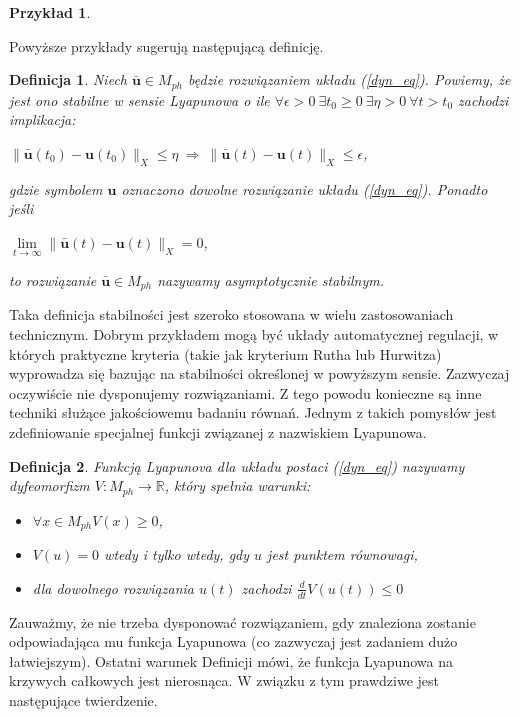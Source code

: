\documentclass[12pt]{article}
\newtheorem{defi}{Definicja}
\newtheorem{przyklad}{Przykład}
\begin{document}
\begin{przyklad}
\end{przyklad}
Powyższe przykłady sugerują następującą definicję.
\begin{defi}\label{stable_point}
	Niech $ \bar{\textbf{u}} \in M_{ph} $ będzie rozwiązaniem układu (\ref{dyn_eq}). Powiemy, że jest ono stabilne w sensie Lyapunowa o ile $\forall \epsilon>0 \  \exists t_{0} \geq 0 \  \exists \eta>0 \  \forall t>t_{0}$ zachodzi implikacja:\newline
\centerline {$ 	\|\bar{\textbf{u}}(t_{0}) - \textbf{u}(t_{0}) \|_{X}  \leq \eta \  \Rightarrow \ \|\bar{\textbf{u}}(t) - \textbf{u}(t) \|_{X}  \leq \epsilon$,}
gdzie symbolem $ \textbf{u} $ oznaczono dowolne rozwiązanie układu (\ref{dyn_eq}).\newline
Ponadto jeśli \newline
\centerline{$ \lim\limits_{t \rightarrow \infty}\|\bar{\textbf{u}}(t) - \textbf{u}(t) \|_{X} = 0$,}
to rozwiązanie $ \bar{\textbf{u}} \in M_{ph} $ nazywamy asymptotycznie stabilnym.
\end{defi}
Taka definicja stabilności jest szeroko stosowana w wielu zastosowaniach technicznym. Dobrym przykładem mogą być układy automatycznej regulacji, w których praktyczne kryteria (takie jak kryterium Rutha lub Hurwitza) wyprowadza się bazując na stabilności określonej w powyższym sensie.\newline
Zazwyczaj oczywiście nie dysponujemy rozwiązaniami. Z tego powodu konieczne są inne techniki służące jakościowemu badaniu równań. Jednym z takich pomysłów jest zdefiniowanie specjalnej funkcji związanej z nazwiskiem Lyapunowa.
\newline
\begin{defi}
	Funkcją Lyapunova dla układu postaci (\ref{dyn_eq}) nazywamy dyfeomorfizm $ V: M_{ph} \rightarrow \mathbb{R} $, który spełnia warunki:
	\begin{itemize}
		\item $\forall x \in M_{ph} V(x) \geq 0$,
		\item $ V(u) = 0 $ wtedy i tylko wtedy, gdy $ u $ jest punktem równowagi,
		\item dla dowolnego rozwiązania $ u(t) $ zachodzi $ \frac{d}{dt}V(u(t)) \leq 0 $
	\end{itemize}
\end{defi}
Zauważmy, że nie trzeba dysponować rozwiązaniem, gdy znaleziona zostanie odpowiadająca mu funkcja Lyapunowa (co zazwyczaj jest zadaniem dużo łatwiejszym). Ostatni warunek  Definicji mówi, że funkcja Lyapunowa na krzywych całkowych jest nierosnąca. W związku z tym prawdziwe jest następujące twierdzenie.
\end{document}
